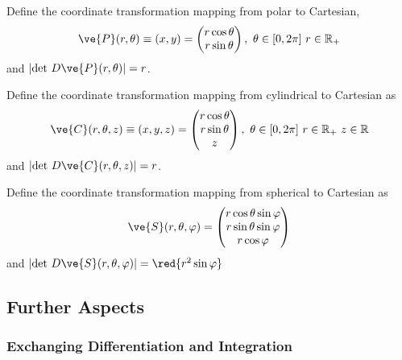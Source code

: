 \documentclass[11pt]{article}
\begin{document}
			\begin{example}
				Define the coordinate transformation mapping from polar to Cartesian,
				\begin{equation}
					\ve{P}(r, \theta) \equiv (x, y) = 
					\begin{pmatrix}
						r \cos{\theta} \\
						r \sin{\theta}
					\end{pmatrix},\ \theta \in [0, 2\pi]\ r \in \R_{+}
				\end{equation}
				and $|\tx{det }D\ve{P}(r, \theta)| = r$.
			\end{example}
			
			\begin{example}
				Define the coordinate transformation mapping from cylindrical to Cartesian as
				\begin{equation}
					\ve{C}(r, \theta, z) \equiv (x, y, z) = 
					\begin{pmatrix}
						r \cos{\theta} \\
						r \sin{\theta} \\
						z
					\end{pmatrix},\ \theta \in [0, 2\pi]\ r \in \R_{+}\ z \in \R
				\end{equation}
				and $|\tx{det }D\ve{C}(r, \theta, z)| = r$.
			\end{example}
			
			\begin{example}
				Define the coordinate transformation mapping from spherical to Cartesian as
				\begin{equation}
					\ve{S}(r, \theta, \varphi) = 
					\begin{pmatrix}
						r \cos{\theta} \sin{\varphi} \\
						r \sin{\theta} \sin{\varphi} \\
						r \cos{\varphi}
					\end{pmatrix}
				\end{equation}
				and $|\tx{det }D\ve{S}(r, \theta, \varphi)| = \red{r^2 \sin{\varphi}}$
			\end{example}
	
		\subsection{Further Aspects}
			\subsubsection{Exchanging Differentiation and Integration}
			
\end{document}
